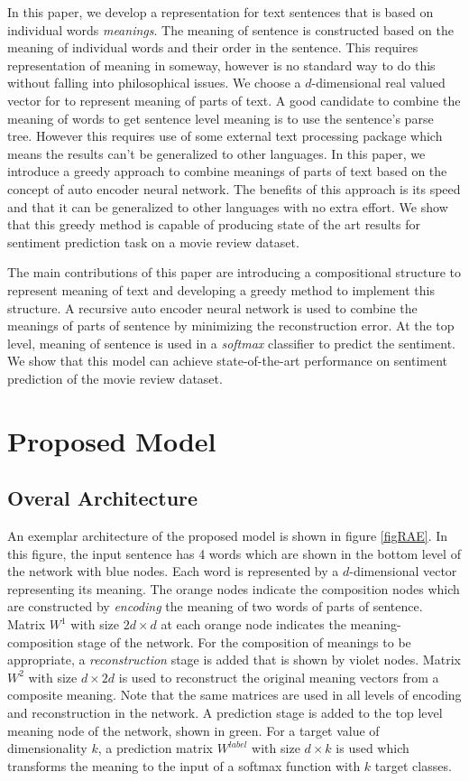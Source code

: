 \documentclass[twoside,12pt]{article}
\begin{document}
In this paper, we develop a representation for text sentences that is based on individual words \emph{meanings}. The meaning of sentence is constructed based on the meaning of individual words and their order in the sentence. This requires representation of meaning in someway, however is no standard way to do this without falling into philosophical issues. We choose a $d$-dimensional real valued vector for to represent meaning of parts of text. A good candidate to combine the meaning of words to get sentence level meaning is to use the sentence's parse tree. However this requires use of some external text processing package which means the results can't be generalized to other languages. In this paper, we introduce a greedy approach to combine meanings of parts of text based on the concept of auto encoder neural network. The benefits of this approach is its speed and that it can be generalized to other languages with no extra effort. We show that this greedy method is capable of producing state of the art results for sentiment prediction task on a movie review dataset.

The main contributions of this paper are introducing a compositional structure to represent meaning of text and developing a greedy method to implement this structure. A recursive auto encoder neural network is used to combine the meanings of parts of sentence by minimizing the reconstruction error. At the top level, meaning of sentence is used in a \emph{softmax} classifier to predict the sentiment. We show that this model can achieve state-of-the-art performance on sentiment prediction of the movie review dataset.

\section{Proposed Model}
\subsection{Overal Architecture}
An exemplar architecture of the proposed model is shown in figure \ref{figRAE}. In this figure, the input sentence has 4 words which are shown in the bottom level of the network with blue nodes. Each word is represented by a $d$-dimensional vector representing its meaning. The orange nodes indicate the composition nodes which are constructed by \emph{encoding} the meaning of two words of parts of sentence. Matrix $W^1$ with size $2d \times d$ at each orange node indicates the meaning-composition stage of the network. For the composition of meanings to be appropriate, a \emph{reconstruction} stage is added that is shown by violet nodes. Matrix $W^2$ with size $d\times 2d$ is used to reconstruct the original meaning vectors from a composite meaning. Note that the same matrices are used in all levels of encoding and reconstruction in the network. A prediction stage is added to the top level meaning node of the network, shown in green. For a target value of dimensionality $k$, a prediction matrix $W^{label}$ with size $d \times k$ is used which transforms the meaning to the input of a softmax function with $k$ target classes.
\end{document}
